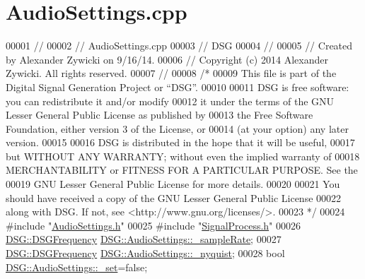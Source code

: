 \hypertarget{_audio_settings_8cpp_source}{\section{Audio\+Settings.\+cpp}
\label{_audio_settings_8cpp_source}
}

\begin{DoxyCode}
00001 \textcolor{comment}{//}
00002 \textcolor{comment}{//  AudioSettings.cpp}
00003 \textcolor{comment}{//  DSG}
00004 \textcolor{comment}{//}
00005 \textcolor{comment}{//  Created by Alexander Zywicki on 9/16/14.}
00006 \textcolor{comment}{//  Copyright (c) 2014 Alexander Zywicki. All rights reserved.}
00007 \textcolor{comment}{//}
00008 \textcolor{comment}{/*}
00009 \textcolor{comment}{ This file is part of the Digital Signal Generation Project or “DSG”.}
00010 \textcolor{comment}{}
00011 \textcolor{comment}{ DSG is free software: you can redistribute it and/or modify}
00012 \textcolor{comment}{ it under the terms of the GNU Lesser General Public License as published by}
00013 \textcolor{comment}{ the Free Software Foundation, either version 3 of the License, or}
00014 \textcolor{comment}{ (at your option) any later version.}
00015 \textcolor{comment}{}
00016 \textcolor{comment}{ DSG is distributed in the hope that it will be useful,}
00017 \textcolor{comment}{ but WITHOUT ANY WARRANTY; without even the implied warranty of}
00018 \textcolor{comment}{ MERCHANTABILITY or FITNESS FOR A PARTICULAR PURPOSE.  See the}
00019 \textcolor{comment}{ GNU Lesser General Public License for more details.}
00020 \textcolor{comment}{}
00021 \textcolor{comment}{ You should have received a copy of the GNU Lesser General Public License}
00022 \textcolor{comment}{ along with DSG.  If not, see <http://www.gnu.org/licenses/>.}
00023 \textcolor{comment}{ */}
00024 \textcolor{preprocessor}{#include "\hyperlink{_audio_settings_8h}{AudioSettings.h}"}
00025 \textcolor{preprocessor}{#include "\hyperlink{_signal_process_8h}{SignalProcess.h}"}
00026 \hyperlink{namespace_d_s_g_a4315a061386fa1014fda09b15d3a6973}{DSG::DSGFrequency} \hyperlink{class_d_s_g_1_1_audio_settings_a56869b51933f102b197f54001c8a1d27}{DSG::AudioSettings::\_sampleRate};
00027 \hyperlink{namespace_d_s_g_a4315a061386fa1014fda09b15d3a6973}{DSG::DSGFrequency} \hyperlink{class_d_s_g_1_1_audio_settings_af3c7cbd15390d9bcbe39983c069390b5}{DSG::AudioSettings::\_nyquist};
00028 \textcolor{keywordtype}{bool} \hyperlink{class_d_s_g_1_1_audio_settings_abd6bfacf2a290d84b3e20487dbf71fa3}{DSG::AudioSettings::\_set}=\textcolor{keyword}{false};

\end{DoxyCode}

